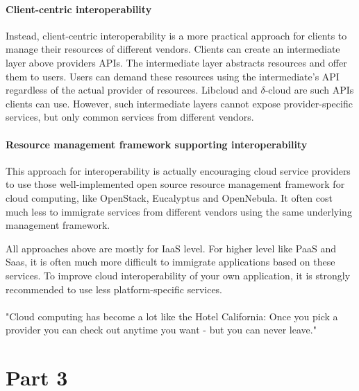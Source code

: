\documentclass[a4paper,11pt]{article}
\begin{document}
\paragraph{Client-centric interoperability}
Instead, client-centric interoperability is a more practical approach for clients to manage their resources of different vendors. Clients can create an intermediate layer above providers APIs. The intermediate layer abstracts resources and offer them to users. Users can demand these resources using the intermediate's API regardless of the actual provider of resources. Libcloud and $\delta$-cloud are such APIs clients can use. However, such intermediate layers cannot expose provider-specific services, but only common services from different vendors.\cite{libcloud}\cite{deltacloud}
\paragraph{Resource management framework supporting interoperability}
This approach for interoperability is actually encouraging cloud service providers to use those well-implemented open source resource management framework for cloud computing, like OpenStack, Eucalyptus and OpenNebula. It often cost much less to immigrate services from different vendors using the same underlying management framework.

All approaches above are mostly for IaaS level. For higher level like PaaS and Saas, it is often much more difficult to immigrate applications based on these services. To improve cloud interoperability of your own application, it is strongly recommended to use less platform-specific services. \\\\
"Cloud computing has become a lot like the Hotel California: Once you pick a provider you can check out anytime you want - but you can never leave."\cite{breakthrough}

\section{Part 3}


\newpage
 

\end{document}
